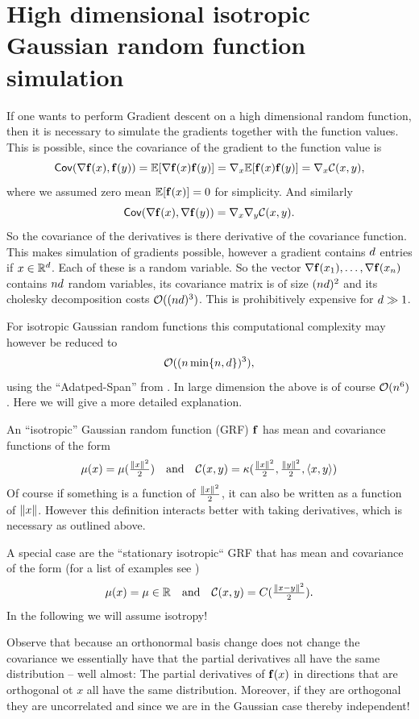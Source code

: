 \section{High dimensional isotropic Gaussian random function simulation}

If one wants to perform Gradient descent on a high dimensional random
function, then it is necessary to simulate the gradients together
with the function values. This is possible, since the covariance
of the gradient to the function value is
\[
	\mathsf{Cov}(\nabla \mathbf{f}(x), \mathbf{f}(y)) = \mathbb{E}[\nabla \mathbf{f}(x) \mathbf{f}(y)]
	= \nabla_x \mathbb{E}[\mathbf{f}(x)\mathbf{f}(y)] = \nabla_x \mathcal{C}(x,y),
\]
where we assumed zero mean \(\mathbb{E}[\mathbf{f}(x)]=0\) for simplicity.
And similarly
\[
\mathsf{Cov}(\nabla \mathbf{f}(x), \nabla\mathbf{f}(y)) = \nabla_x \nabla_y\mathcal{C}(x,y).
\]
So the covariance of the derivatives is there derivative
of the covariance function. This makes simulation
of gradients possible, however a gradient contains \(d\)
entries if \(x\in \mathbb{R}^d\). Each of these is a random variable.
So the vector \(\nabla \mathbf{f}(x_1), \dots, \nabla\mathbf{f}(x_n)\) contains
\(nd\) random variables, its covariance matrix is of size \((nd)^2\)
and its cholesky decomposition costs \(\mathcal{O}((nd)^3)\). This is
prohibitively expensive for \(d \gg 1\).

For isotropic Gaussian random functions this computational complexity may
however be reduced to 
\[
	\mathcal{O}((n \min\{n, d\})^3),
\]
using the ``Adatped-Span'' from
\citep{benningGradientSpanAlgorithms2024}. In large dimension the above is of
course \(\mathcal{O}(n^6)\). Here we will give a more detailed explanation.

An ``isotropic'' Gaussian random function (GRF) \(\mathbf{f}\) has mean and covariance functions
of the form
\[
	\mu(x) = \mu(\tfrac{\lVert x\rVert^2}2)
	\quad\text{and}\quad \mathcal{C}(x,y) = \kappa(\tfrac{\lVert x\rVert^2}2, \tfrac{\lVert y\rVert^2}2, \langle x, y\rangle)
\]
Of course if something is a function of \(\tfrac{\lVert x\rVert^2}2\), it can also be written
as a function of \(\lVert x\rVert\). However this definition interacts better with
taking derivatives, which is necessary as outlined above.

A special case are the ``stationary isotropic`` GRF that has mean and covariance
of the form (for a list of examples see \citep[Ch.~5]{rasmussenGaussianProcessesMachine2006})
\[
	\mu(x) = \mu \in \mathbb{R}
	\quad \text{and} \quad \mathcal{C}(x,y) = C(\tfrac{\lVert x-y\rVert^2}2).
\]
In the following we will assume isotropy!

Observe that because an orthonormal basis change does not change the covariance
we essentially have that the partial derivatives all have the same distribution
-- well almost: The partial derivatives of \(\mathbf{f}(x)\) in directions that are
orthogonal ot \(x\) all have the same distribution. Moreover, if they are
orthogonal they are uncorrelated and since we are in the Gaussian case thereby
independent!


